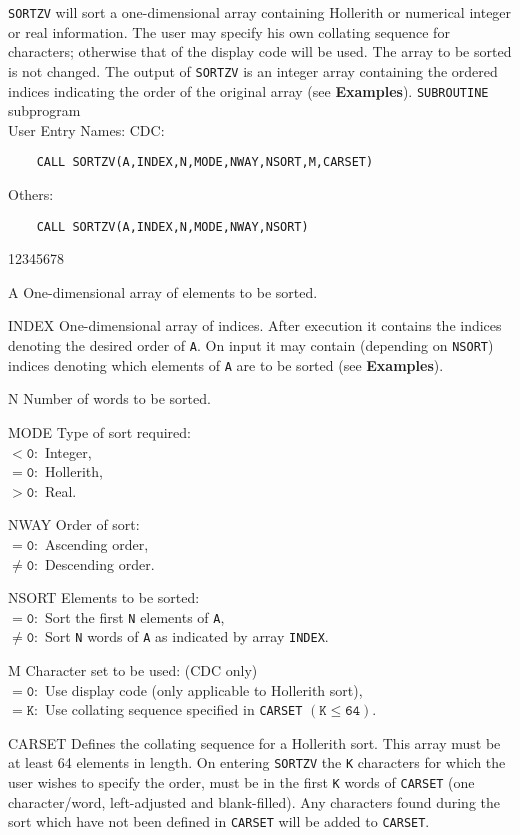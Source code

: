                     
                 
\Submitter{}                           
{\tt SORTZV} will sort a one-dimensional array containing
Hollerith or numerical integer or real information. The
user may specify his own collating sequence for characters;
otherwise that of the display code will be used. The array to be
sorted is not changed. The output of {\tt SORTZV} is an integer array
containing the ordered indices indicating the order of the original
array (see {\bf Examples}).
\Structure
{\tt SUBROUTINE} subprogram \\
User Entry Names: 
\Usage
CDC:
\begin{verbatim}
    CALL SORTZV(A,INDEX,N,MODE,NWAY,NSORT,M,CARSET)
\end{verbatim}
Others:
\begin{verbatim}
    CALL SORTZV(A,INDEX,N,MODE,NWAY,NSORT)
\end{verbatim}
\begin{DLtt}{12345678}
\item [A] One-dimensional array of elements to be sorted.
\item [INDEX] One-dimensional array of indices. After execution
it contains the indices denoting the desired order of {\tt A}. On input
it may contain (depending on {\tt NSORT}) indices denoting which
elements of {\tt A} are to be sorted (see {\bf Examples}).
\item [N] Number of words to be sorted.
\item [MODE] Type of sort required: \\
$\mathtt{< 0:}$ Integer,  \\
$\mathtt{= 0:}$ Hollerith, \\
$\mathtt{> 0:}$ Real.
\item [NWAY] Order of sort: \\
$\mathtt{= 0:}$ Ascending order, \\
$\mathtt{\neq 0:}$ Descending order.
\item [NSORT] Elements to be sorted: \\
$\mathtt{= 0:}$ Sort the first {\tt N} elements of {\tt A}, \\
$\mathtt{\neq 0:}$ Sort {\tt N} words of {\tt A} as indicated by array
{\tt INDEX}.
\item [M] Character set to be used: (CDC only) \\
$\mathtt{= 0:}$ Use display code (only applicable to Hollerith sort), \\
$\mathtt{= K:}$ Use collating sequence specified in {\tt CARSET}
$\mathtt{(K \leq 64)}$.
\item [CARSET] Defines the collating sequence for a Hollerith sort.
This array must be at least 64 elements in length. On entering
{\tt SORTZV} the {\tt K} characters for which the user
wishes to specify the order, must be in the first {\tt K} words of
{\tt CARSET} (one character/word, left-adjusted and blank-filled).
Any characters found during the sort which have not been defined in
{\tt CARSET} will be added to {\tt CARSET}.
\end{DLtt}
